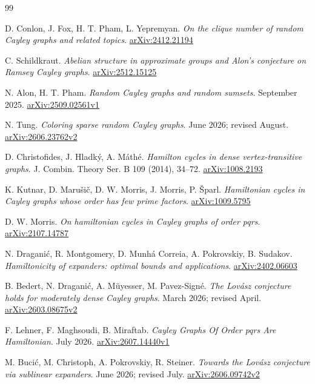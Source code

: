 \begin{thebibliography}{99}

 D. Conlon, J. Fox, H. T. Pham, L. Yepremyan. \emph{On the clique number of random Cayley graphs and related topics}. \href{https://arxiv.org/abs/2412.21194}{arXiv:2412.21194}

 C. Schildkraut. \emph{Abelian structure in approximate groups and Alon's conjecture on Ramsey Cayley graphs}. \href{https://arxiv.org/abs/2512.15125}{arXiv:2512.15125}

 N. Alon, H. T. Pham. \emph{Random Cayley graphs and random sumsets}. September 2025. \href{https://arxiv.org/abs/2509.02561v1}{arXiv:2509.02561v1}

 N. Tung. \emph{Coloring sparse random Cayley graphs}. June 2026; revised August. \href{https://arxiv.org/abs/2606.23762v2}{arXiv:2606.23762v2}

 D. Christofides, J. Hladk\'y, A. M\'ath\'e. \emph{Hamilton cycles in dense vertex-transitive graphs}. J. Combin. Theory Ser. B 109 (2014), 34--72. \href{https://arxiv.org/abs/1008.2193}{arXiv:1008.2193}

 K. Kutnar, D. Maru\v{s}i\v{c}, D. W. Morris, J. Morris, P. \v{S}parl. \emph{Hamiltonian cycles in Cayley graphs whose order has few prime factors}. \href{https://arxiv.org/abs/1009.5795}{arXiv:1009.5795}

 D. W. Morris. \emph{On hamiltonian cycles in Cayley graphs of order pqrs}. \href{https://arxiv.org/abs/2107.14787}{arXiv:2107.14787}

 N. Dragani\'c, R. Montgomery, D. Munh\'a Correia, A. Pokrovskiy, B. Sudakov. \emph{Hamiltonicity of expanders: optimal bounds and applications}. \href{https://arxiv.org/abs/2402.06603}{arXiv:2402.06603}

 B. Bedert, N. Dragani\'c, A. M\"uyesser, M. Pavez-Sign\'e. \emph{The Lov\'asz conjecture holds for moderately dense Cayley graphs}. March 2026; revised April. \href{https://arxiv.org/abs/2603.08675v2}{arXiv:2603.08675v2}

 F. Lehner, F. Maghsoudi, B. Miraftab. \emph{Cayley Graphs Of Order pqrs Are Hamiltonian}. July 2026. \href{https://arxiv.org/abs/2607.14440v1}{arXiv:2607.14440v1}

 M. Buci\'c, M. Christoph, A. Pokrovskiy, R. Steiner. \emph{Towards the Lov\'asz conjecture via sublinear expanders}. June 2026; revised July. \href{https://arxiv.org/abs/2606.09742v2}{arXiv:2606.09742v2}


\end{thebibliography}
